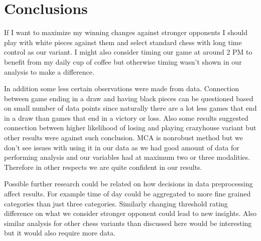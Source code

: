 \section{Conclusions}
\label{sec:conclusions}

If I want to maximize my winning changes against stronger opponents I should play with white pieces against them and select standard chess with long time control as our variant. I might also consider timing our game at around 2 PM to benefit from my daily cup of coffee but otherwise timing wasn't shown in our analysis to make a difference.

In addition some less certain observations were made from data. Connection between game ending in a draw and having black pieces can be questioned based on small number of data points since naturally there are a lot less games that end in a draw than games that end in a victory or loss. Also some results suggested connection between higher likelihood of losing and playing crazyhouse variant but other results were against such conclusion. MCA is nonrobust method but we don't see issues with using it in our data as we had good amount of data for performing analysis and our variables had at maximum two or three modalities. Therefore in other respects we are quite confident in our results.

Possible further research could be related on how decisions in data preprocessing affect results. For example time of day could be aggregated to more fine grained categories than just three categories. Similarly changing threshold rating difference on what we consider stronger opponent could lead to new insights. Also similar analysis for other chess variants than discussed here would be interesting but it would also require more data.